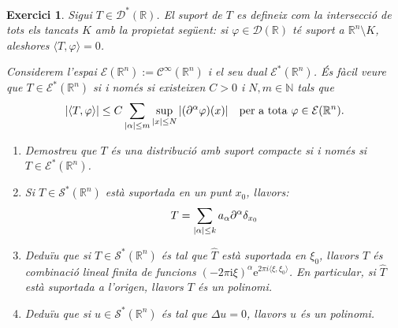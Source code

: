 \documentclass[10pt,a4paper]{article}
\newcommand{\NN}{\ensuremath{\mathbb{N}}} %
\newcommand{\RR}{\ensuremath{\mathbb{R}}} %
\newcommand{\ii}{\mathrm{i}} %
\newtheorem{exercici}{Exercici}
\theoremstyle{definition}
\theoremstyle{remark}
\renewcommand{\exp}[1]{\mathrm{e}^{#1}} %
\begin{document}
\begin{exercici}
  Sigui $T\in \mathcal{D}^*(\RR)$. El \emph{suport} de $T$ es defineix com la intersecció de tots els tancats $K$ amb la propietat següent: si $\varphi\in\mathcal{D}(\RR)$ té suport a $\RR^n \setminus K$, aleshores $\langle T,\varphi\rangle=0$.

  Considerem l'espai $\mathcal{E}(\RR^n):=\mathcal{C}^\infty(\RR^n)$ i el seu dual $\mathcal{E}^*(\RR^n)$. És fàcil veure que $T\in \mathcal{E}^*(\RR^n)$ si i només si existeixen $C>0$ i $N, m\in\NN$ tals que
  \begin{equation}\label{eq:1}
    \abs{\langle T,\varphi\rangle}\leq C\sum_{\abs{\alpha}\leq m}\sup_{\abs{x}\leq N}\abs{(\partial^\alpha\varphi)(x)}\quad\text{per a tota }\varphi\in\mathcal{E}(\RR^n).
  \end{equation}
  \begin{enumerate}
    \item Demostreu que $T$ és una distribució amb suport compacte si i només si $T\in \mathcal{E}^*(\RR^n)$.
    \item Si $T\in \mathcal{S}^*(\RR^n)$ està suportada en un punt $x_0$, llavors:
          $$
            T=\sum_{\abs{\alpha}\leq k}a_\alpha\partial^\alpha\delta_{x_0}
          $$
    \item Deduïu que si $T\in \mathcal{S}^*(\RR^n)$ és tal que $\widehat{T}$ està suportada en $\xi_0$, llavors $T$ és combinació lineal finita de funcions ${(-2\pi\ii\xi)}^\alpha\exp{2\pi i\langle \xi,\xi_0\rangle}$. En particular, si $\widehat{T}$ està suportada a l'origen, llavors $T$ és un polinomi.
    \item Deduïu que si $u\in \mathcal{S}^*(\RR^n)$ és tal que $\Delta u=0$, llavors $u$ és un polinomi.
  \end{enumerate}
\end{exercici}
\end{document}
